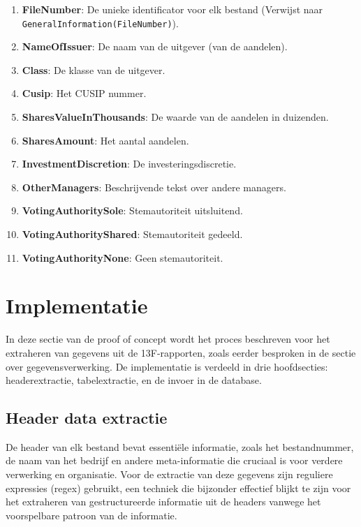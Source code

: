 \begin{enumerate}
    \item \textbf{FileNumber}: De unieke identificator voor elk bestand (Verwijst naar \texttt{GeneralInformation(FileNumber)}).
    \item \textbf{NameOfIssuer}: De naam van de uitgever (van de aandelen).
    \item \textbf{Class}: De klasse van de uitgever.
    \item \textbf{Cusip}: Het CUSIP nummer.
    \item \textbf{SharesValueInThousands}: De waarde van de aandelen in duizenden.
    \item \textbf{SharesAmount}: Het aantal aandelen.
    \item \textbf{InvestmentDiscretion}: De investeringsdiscretie.
    \item \textbf{OtherManagers}: Beschrijvende tekst over andere managers.
    \item \textbf{VotingAuthoritySole}: Stemautoriteit uitsluitend.
    \item \textbf{VotingAuthorityShared}: Stemautoriteit gedeeld.
    \item \textbf{VotingAuthorityNone}: Geen stemautoriteit.
\end{enumerate}

\section{Implementatie}
In deze sectie van de proof of concept wordt het proces beschreven voor het extraheren van gegevens uit de 13F-rapporten, zoals eerder besproken in de sectie over gegevensverwerking. De implementatie is verdeeld in drie hoofdsecties: headerextractie, tabelextractie, en de invoer in de database.



\subsection{Header data extractie}
De header van elk bestand bevat essentiële informatie, zoals het bestandnummer, de naam van het bedrijf en andere meta-informatie die cruciaal is voor verdere verwerking en organisatie. Voor de extractie van deze gegevens zijn reguliere expressies (regex) gebruikt, een techniek die bijzonder effectief blijkt te zijn voor het extraheren van gestructureerde informatie uit de headers vanwege het voorspelbare patroon van de informatie.



